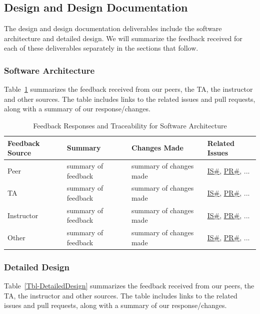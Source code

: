\documentclass{article}
\begin{document}
\subsection{Design and Design Documentation}

The design and design documentation deliverables include the software
architecture and detailed design.  We will summarize the feedback received for
each of these deliverables separately in the sections that follow.

\subsubsection{Software Architecture}

Table~\ref{Tbl-Architecture} summarizes the feedback received from our peers,
the TA, the instructor and other sources.  The table includes links to the
related issues and pull requests, along with a summary of our response/changes.

\begin{longtable}{|p{2cm}|p{4cm}|p{5cm}|p{4cm}|}
\caption{Feedback Responses and Traceability for Software Architecture}
\label{Tbl-Architecture}\\

\hline
\textbf{Feedback Source} & \textbf{Summary} & \textbf{Changes Made} & \textbf{Related Issues} \\ 
\hline
\endhead

Peer & summary of feedback & summary of changes made & \href{link}{IS\#}, \href{link}{PR\#}, ... \\
\hline
TA & summary of feedback & summary of changes made & \href{link}{IS\#}, \href{link}{PR\#}, ... \\
\hline
Instructor & summary of feedback & summary of changes made & \href{link}{IS\#}, \href{link}{PR\#}, ... \\
\hline
Other & summary of feedback & summary of changes made & \href{link}{IS\#}, \href{link}{PR\#}, ... \\
\hline
\end{longtable}

\subsubsection{Detailed Design}

Table~\ref{Tbl-DetailedDesign} summarizes the feedback received from our peers,
the TA, the instructor and other sources.  The table includes links to the
related issues and pull requests, along with a summary of our response/changes.
\end{document}
